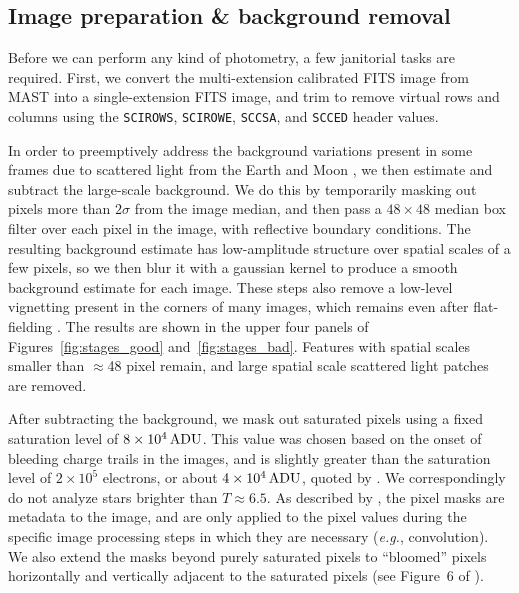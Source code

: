 \documentclass[12pt,twocolumn,tighten]{aastex62}
\begin{document}
\subsection{Image preparation \& background removal}
\label{subsec:preparation}

Before we can perform any kind of photometry, a few janitorial tasks
are required.
First, we convert the multi-extension calibrated FITS image from MAST
into a single-extension FITS image, and trim to remove virtual rows
and columns using the \texttt{SCIROWS}, \texttt{SCIROWE},
\texttt{SCCSA}, and \texttt{SCCED} header values.

In order to preemptively address the background variations present in
some frames due to scattered light from the Earth and Moon
\citep[see][\S 7.3.1--7.3.4]{vanderspek_2018}, we then estimate and
subtract the large-scale background.  We do this by temporarily
masking out pixels more than $2\sigma$ from the image median, and then
pass a $48\times48$ median box filter over each pixel in the image,
with reflective boundary conditions.  The resulting background
estimate has low-amplitude structure over spatial scales of a few
pixels, so we then blur it with a gaussian kernel to produce a smooth
background estimate for each image.  These steps also remove a
low-level vignetting present in the corners of many images, which
remains even after flat-fielding \citep[see][\S
7.3.5]{vanderspek_2018}.  
The results are shown in the upper four panels of Figures~\ref{fig:stages_good}
and~\ref{fig:stages_bad}.
Features with spatial scales smaller than $\approx$48 pixel remain, 
and large spatial scale scattered light patches are removed.


After subtracting the background, we mask out saturated pixels using a
fixed saturation level of $8\times10^4\,{\rm ADU}$. This value was
chosen based on the onset of bleeding charge trails in the images, and
is slightly greater than the saturation level of $2\times10^5$
electrons, or about $4\times10^4\,{\rm ADU}$, quoted by
\citet{vanderspek_2018}. 
We correspondingly do not analyze stars brighter than $T\approx 6.5$.
As described by \citet{Pal_2009}, the pixel masks are metadata to the
image, and are only applied to the pixel values during the specific
image processing steps in which they are necessary ({\it e.g.},
convolution). We also extend the masks beyond purely saturated pixels
to ``bloomed'' pixels horizontally and vertically adjacent to the
saturated pixels (see Figure~6 of \citealt{Pal_2009}).
\end{document}
